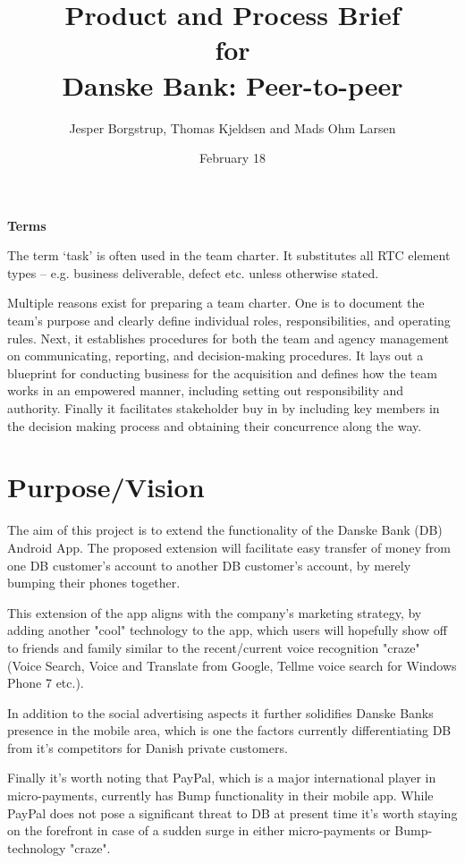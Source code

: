 \documentclass[a4paper,11pt]{article}
\title{Product and Process Brief\\\small{for}\\\small{Danske Bank: Peer-to-peer}}
\author{ Jesper Borgstrup, Thomas Kjeldsen and Mads Ohm Larsen }
\date{February 18}
\begin{document}
\ifpdf
{}
\else
{}
\fi

\maketitle

\tableofcontents
\vspace{2cm}

\noindent\textbf{Terms}

The term ‘task’ is often used in the team charter. 
It substitutes all RTC element types – e.g. business deliverable, defect etc. unless otherwise stated.

\pagebreak
Multiple reasons exist for preparing a team charter. One is to document the team’s purpose and clearly define individual roles, responsibilities, and operating rules. Next, it establishes procedures for both the team and agency management on communicating, reporting, and decision-making procedures. It lays out a blueprint for conducting business for the acquisition and defines how the team works in an empowered manner, including setting out responsibility and authority. Finally it facilitates stakeholder buy in by including key members in the decision making process and obtaining their concurrence along the way. 

\section{Purpose/Vision} %
\label{sec:purpose_vision}

The aim of this project is to extend the functionality of the Danske Bank (DB) Android App. The proposed extension will facilitate easy transfer of money from one DB customer's account to another DB customer's account, by merely bumping their phones together.

This extension of the app aligns with the company's marketing strategy, by adding another "cool" technology to the app, which users will hopefully show off to friends and family similar to the recent/current voice recognition "craze" (Voice Search, Voice and Translate from Google, Tellme voice search for Windows Phone 7 etc.).

In addition to the social advertising aspects it further solidifies Danske Banks presence in the mobile area, which is one the factors currently differentiating DB from it's competitors for Danish private customers. 

Finally it's worth noting that PayPal, which is a major international player in micro-payments, currently has Bump functionality in their mobile app. While PayPal does not pose a significant threat to DB at present time it's worth staying on the forefront in case of a sudden surge in either micro-payments or Bump-technology "craze".
\end{document}
